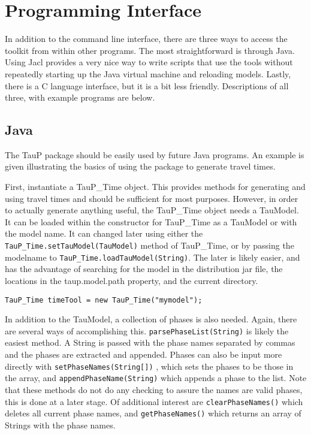 
\section{Programming Interface}

In addition to the command line interface, there are three ways to access
the toolkit from within other programs. The most straightforward is
through Java. Using Jacl provides a very nice way to write scripts that
use the tools without repeatedly starting up the Java virtual machine and
reloading models. Lastly, there is a C language interface, but it is
a bit less friendly. Descriptions of all three, with example programs
are below.

\subsection{Java}

The TauP package should be easily used by future Java programs. An
example is given illustrating the basics of using the package to
generate travel times.

First, instantiate a TauP\_Time object. This provides methods for
generating and
using travel times and should be sufficient for most purposes.
However, in order to actually generate anything useful, the TauP\_Time
object needs a TauModel. It can be loaded within the constructor for TauP\_Time
as a TauModel or with the model name.
It can changed later using either the \texttt{TauP\_Time.setTauModel(TauModel)} method of
TauP\_Time, or by passing the modelname to \texttt{TauP\_Time.loadTauModel(String)}.
The later is likely easier, and has the advantage of searching for the model in
the distribution jar file, the locations in the taup.model.path property,
and the current directory.

\texttt{TauP\_Time timeTool = new TauP\_Time("mymodel");}

In addition to the TauModel, a collection of phases is also needed. Again,
there are several ways of accomplishing this.
\texttt{parsePhaseList(String)} is likely the easiest method. A String is passed
with the phase names separated by commas and the phases are extracted and
appended. Phases can also be input more
directly with \texttt{setPhaseNames(String[])} ,
which sets the phases to be those in the array, and
\texttt{appendPhaseName(String)} which appends a phase to the list. Note that
these methods do not do any checking to assure the names are valid phases,
this is done at a later stage. Of additional interest are
\texttt{clearPhaseNames()} which deletes all current phase names, and
\texttt{getPhaseNames()} which returns an array of Strings with the phase names.

